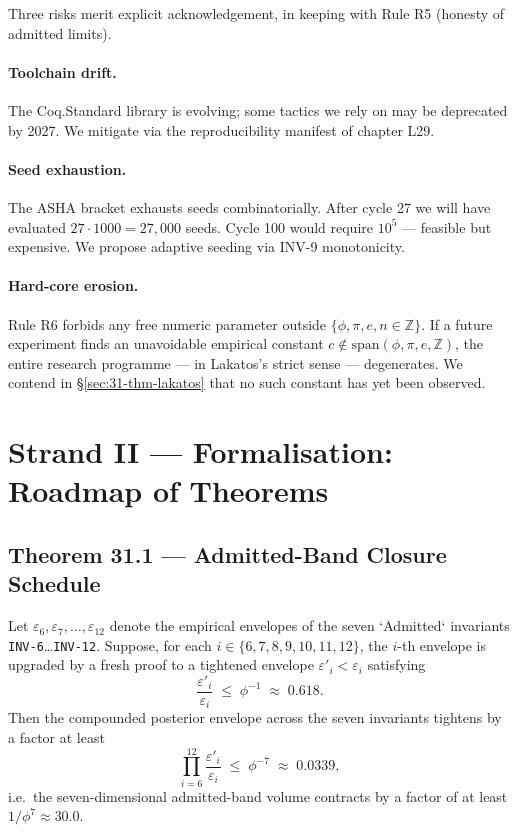 Three risks merit explicit acknowledgement, in keeping with Rule R5 (honesty of admitted limits).

\paragraph{Toolchain drift.} The Coq.Standard library is evolving; some tactics we rely on may be deprecated by 2027. We mitigate via the reproducibility manifest of chapter L29.

\paragraph{Seed exhaustion.} The ASHA bracket exhausts seeds combinatorially. After cycle 27 we will have evaluated $27 \cdot 1000 = 27{,}000$ seeds. Cycle 100 would require $10^{5}$ — feasible but expensive. We propose adaptive seeding via INV-9 monotonicity.

\paragraph{Hard-core erosion.} Rule R6 forbids any free numeric parameter outside $\{\phi, \pi, e, n \in \mathbb{Z}\}$. If a future experiment finds an unavoidable empirical constant $c \notin \mathrm{span}(\phi, \pi, e, \mathbb{Z})$, the entire research programme — in Lakatos's strict sense — degenerates. We contend in §\ref{sec:31-thm-lakatos} that no such constant has yet been observed.

\section{Strand II — Formalisation: Roadmap of Theorems}
\label{sec:31-strand-2}

\subsection{Theorem 31.1 — Admitted-Band Closure Schedule}
\label{sec:31-thm-closure}

\begin{theorem}
\label{thm:31-1-closure}
Let $\varepsilon_{6}, \varepsilon_{7}, \dots, \varepsilon_{12}$ denote the empirical envelopes of the seven `Admitted` invariants \texttt{INV-6}…\texttt{INV-12}. Suppose, for each $i \in \{6,7,8,9,10,11,12\}$, the $i$-th envelope is upgraded by a fresh proof to a tightened envelope $\varepsilon'_{i} < \varepsilon_{i}$ satisfying
\[
\frac{\varepsilon'_{i}}{\varepsilon_{i}} \;\leq\; \phi^{-1} \;\approx\; 0.618.
\]
Then the compounded posterior envelope across the seven invariants tightens by a factor at least
\[
\prod_{i=6}^{12} \frac{\varepsilon'_{i}}{\varepsilon_{i}} \;\leq\; \phi^{-7} \;\approx\; 0.0339,
\]
i.e.\ the seven-dimensional admitted-band volume contracts by a factor of at least $1/\phi^{7} \approx 30.0$.
\end{theorem}

